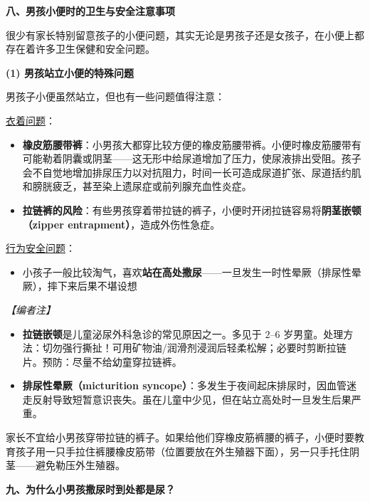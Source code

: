 \vspace{0.8em}
\noindent\textbf{八、男孩小便时的卫生与安全注意事项}

很少有家长特别留意孩子的小便问题，其实无论是男孩子还是女孩子，在小便上都存在着许多卫生保健和安全问题。

\vspace{0.5em}
\noindent\textbf{(1) 男孩站立小便的特殊问题}

男孩子小便虽然站立，但也有一些问题值得注意：

\underline{衣着问题}：
\begin{itemize}
	\item \textbf{橡皮筋腰带裤}：小男孩大都穿比较方便的橡皮筋腰带裤。小便时橡皮筋腰带有可能勒着阴囊或阴茎——这无形中给尿道增加了压力，使尿液排出受阻。孩子会不自觉地增加排尿压力以对抗阻力，时间一长可造成尿道扩张、尿道括约肌和膀胱疲乏，甚至染上遗尿症或前列腺充血性炎症。
	\item \textbf{拉链裤的风险}：有些男孩穿着带拉链的裤子，小便时开闭拉链容易将\textbf{阴茎嵌顿（zipper entrapment）}，造成外伤性急症。
\end{itemize}

\underline{行为安全问题}：
\begin{itemize}
	\item 小孩子一般比较淘气，喜欢\textbf{站在高处撒尿}——一旦发生一时性晕厥（排尿性晕厥），摔下来后果不堪设想
\end{itemize}

\vspace{0.3em}
\noindent\textit{【编者注】}
\begin{itemize}
	\item \textbf{拉链嵌顿}是儿童泌尿外科急诊的常见原因之一。多见于 $2$--$6$ 岁男童。处理方法：切勿强行撕扯！可用矿物油/润滑剂浸润后轻柔松解；必要时剪断拉链片。预防：尽量不给幼童穿拉链裤。
	\item \textbf{排尿性晕厥（micturition syncope）}：多发生于夜间起床排尿时，因血管迷走反射导致短暂意识丧失。虽在儿童中少见，但在站立高处时一旦发生后果严重。
\end{itemize}

\begin{tcolorbox}[colback=pink!5!white,colframe=red!50!black,title=贴心小叮咛]
家长不宜给小男孩穿带拉链的裤子。如果给他们穿橡皮筋裤腰的裤子，小便时要教育孩子用一只手拉住裤腰橡皮筋带（位置要放在外生殖器下面），另一只手托住阴茎——避免勒压外生殖器。
\end{tcolorbox}

\vspace{0.8em}
\noindent\textbf{九、为什么小男孩撒尿时到处都是尿？}

